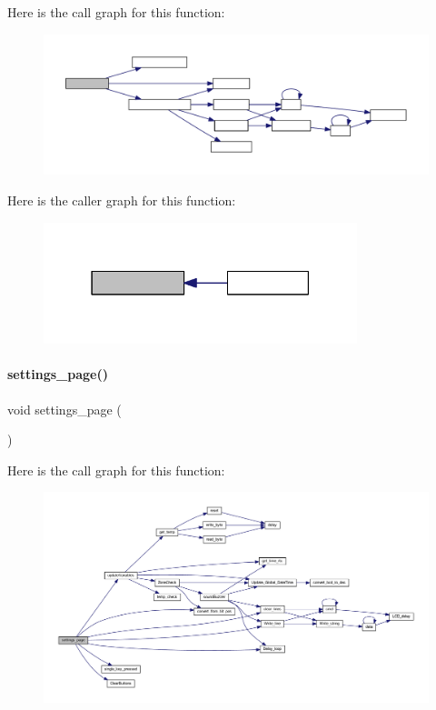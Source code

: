 Here is the call graph for this function\+:
\nopagebreak
\begin{figure}[H]
\begin{center}
\leavevmode
\includegraphics[width=350pt]{a00038_a4ea9ddbddca3d537bf00dcbd508a6434_cgraph}
\end{center}
\end{figure}
Here is the caller graph for this function\+:
\nopagebreak
\begin{figure}[H]
\begin{center}
\leavevmode
\includegraphics[width=259pt]{a00038_a4ea9ddbddca3d537bf00dcbd508a6434_icgraph}
\end{center}
\end{figure}
\mbox{\label{a00038_af290e08d29e4fa8a86d020c45b6c7552}} 
\paragraph{settings\+\_\+page()}
{\footnotesize\ttfamily void settings\+\_\+page (\begin{DoxyParamCaption}{ }\end{DoxyParamCaption})}

Here is the call graph for this function\+:
\nopagebreak
\begin{figure}[H]
\begin{center}
\leavevmode
\includegraphics[width=350pt]{a00038_af290e08d29e4fa8a86d020c45b6c7552_cgraph}
\end{center}
\end{figure}
\mbox{\label{a00038_a4b26f408a34637904178d99db3f715f7}} 
